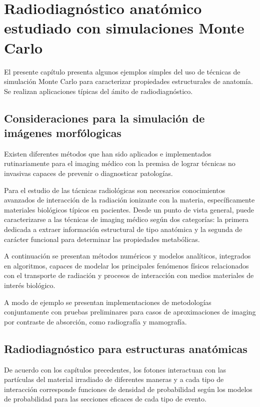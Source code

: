 \chapter{Radiodiagn\'ostico anat\'omico estudiado con simulaciones Monte Carlo}

El presente capítulo presenta algunos ejemplos simples del uso de técnicas de simulación Monte Carlo para caracterizar propiedades estructurales de anatomía. Se realizan aplicaciones típicas del ámito de radiodiagnóstico.

\section{Consideraciones para la simulaci\'on de imágenes morf\'ologicas}

Existen diferentes métodos que han sido aplicados e implementados rutinariamente para el imaging médico con la premisa de lograr técnicas no invasivas capaces de prevenir o diagnosticar patologías.

Para el estudio de las tácnicas radiológicas son necesarios conocimientos avanzados de interacción de la radiación ionizante con la materia, específicamente materiales biológicos típicos en pacientes. Desde un punto de vista general, puede caracterizarse a las técnicas de imaging médico según dos categorías: la primera dedicada a extraer información estructural de tipo anatómica y la segunda de carácter funcional para determinar las propiedades metabólicas.

A continuación se presentan métodos numéricos y modelos analíticos, integrados en algoritmos, capaces de modelar los principales fenómenos físicos relacionados con el transporte de radiación y procesos de interacción con medios materiales de interés biológico.

A modo de ejemplo se presentan implementaciones de metodologías conjuntamente con pruebas preliminares para casos de aproximaciones de imaging por contraste de absorción, como radiografía y mamografía.

\section{Radiodiagn\'ostico para estructuras anat\'omicas}

De acuerdo con los capítulos precedentes, los fotones interactuan con las partículas del material irradiado de diferentes maneras y a cada tipo de interacción corresponde funciones de densidad de probabilidad según los modelos de probabilidad para las secciones eficaces de cada tipo de evento.


